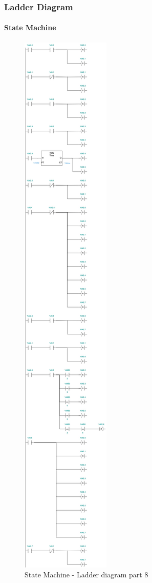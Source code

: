 \documentclass[12pt]{beamer}
\begin{document}
\begin{frame}
\frametitle{Ladder Diagram}
\framesubtitle{State Machine}
\begin{figure}
    \centering
    \includegraphics[trim={0 21cm 0 77cm}, clip, scale=.5]{img/Ladder_diagram_2.jpg}
    \caption{State Machine - Ladder diagram part 8}
    \label{fig:ladder28}
\end{figure}
\end{frame}
\end{document}

